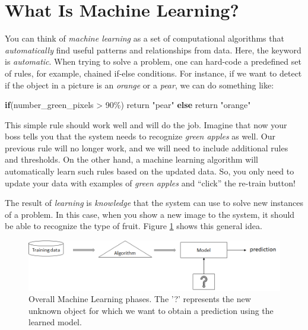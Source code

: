 \documentclass[
  11pt,
]{krantz}
\newenvironment{Shaded}{\begin{snugshade}}{\end{snugshade}}
\newcommand{\ControlFlowTok}[1]{\textcolor[rgb]{0.27,0.27,0.27}{\textbf{#1}}}
\newcommand{\DecValTok}[1]{\textcolor[rgb]{0.06,0.06,0.06}{#1}}
\newcommand{\NormalTok}[1]{#1}
\newcommand{\SpecialCharTok}[1]{\textcolor[rgb]{0,0,0}{#1}}
\newcommand{\StringTok}[1]{\textcolor[rgb]{0.5,0.5,0.5}{#1}}
\begin{document}
\hypertarget{what-is-machine-learning}{%
\section{What Is Machine Learning?}\label{what-is-machine-learning}}

You can think of \emph{machine learning} as a set of computational algorithms that \emph{automatically} find useful patterns and relationships from data. Here, the keyword is \emph{automatic}. When trying to solve a problem, one can hard-code a predefined set of rules, for example, chained if-else conditions. For instance, if we want to detect if the object in a picture is an \emph{orange} or a \emph{pear}, we can do something like:

\begin{Shaded}
\begin{Highlighting}[]
\ControlFlowTok{if}\NormalTok{(number\_green\_pixels }\SpecialCharTok{\textgreater{}} \DecValTok{90}\NormalTok{\%)}
\NormalTok{  return }\StringTok{"pear"}
\ControlFlowTok{else}
\NormalTok{  return }\StringTok{"orange"}
\end{Highlighting}
\end{Shaded}

This simple rule should work well and will do the job. Imagine that now your boss tells you that the system needs to recognize \emph{green apples} as well. Our previous rule will no longer work, and we will need to include additional rules and thresholds. On the other hand, a machine learning algorithm will automatically learn such rules based on the updated data. So, you only need to update your data with examples of \emph{green apples} and ``click'' the re-train button!

The result of \emph{learning} is \emph{knowledge} that the system can use to solve new instances of a problem. In this case, when you show a new image to the system, it should be able to recognize the type of fruit. Figure \ref{fig:mlPhases} shows this general idea.

\begin{figure}

{\centering \includegraphics[width=1\linewidth]{images/ml} 

}

\caption{Overall Machine Learning phases. The '?' represents the new unknown object for which we want to obtain a prediction using the learned model.}\label{fig:mlPhases}
\end{figure}
\end{document}
